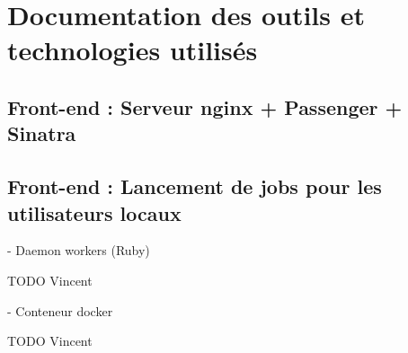 \newpage

\chapter{Documentation des outils et technologies utilisés}

\section{Front-end : Serveur nginx + Passenger + Sinatra}



\section{Front-end : Lancement de jobs pour les utilisateurs locaux} 



- Daemon workers (Ruby) 

TODO Vincent

- Conteneur docker

TODO Vincent
